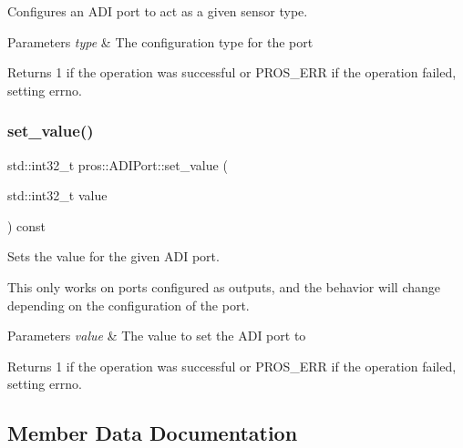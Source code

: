 Configures an A\+DI port to act as a given sensor type. 


\begin{DoxyParams}{Parameters}
{\em type} & The configuration type for the port\\
\hline
\end{DoxyParams}
\begin{DoxyReturn}{Returns}
1 if the operation was successful or P\+R\+O\+S\+\_\+\+E\+RR if the operation failed, setting errno. 
\end{DoxyReturn}
\mbox{\label{classpros_1_1ADIPort_ae6711117fbceb3bb6e3602c4ef63aff1}} 
\subsubsection{\texorpdfstring{set\+\_\+value()}{set\_value()}}
{\footnotesize\ttfamily std\+::int32\+\_\+t pros\+::\+A\+D\+I\+Port\+::set\+\_\+value (\begin{DoxyParamCaption}\item[{std\+::int32\+\_\+t}]{value }\end{DoxyParamCaption}) const}



Sets the value for the given A\+DI port. 

This only works on ports configured as outputs, and the behavior will change depending on the configuration of the port.


\begin{DoxyParams}{Parameters}
{\em value} & The value to set the A\+DI port to\\
\hline
\end{DoxyParams}
\begin{DoxyReturn}{Returns}
1 if the operation was successful or P\+R\+O\+S\+\_\+\+E\+RR if the operation failed, setting errno. 
\end{DoxyReturn}


\subsection{Member Data Documentation}
\mbox{\label{classpros_1_1ADIPort_a75f3b6c1ae3c1f6b755e18444e7559d6}} 
